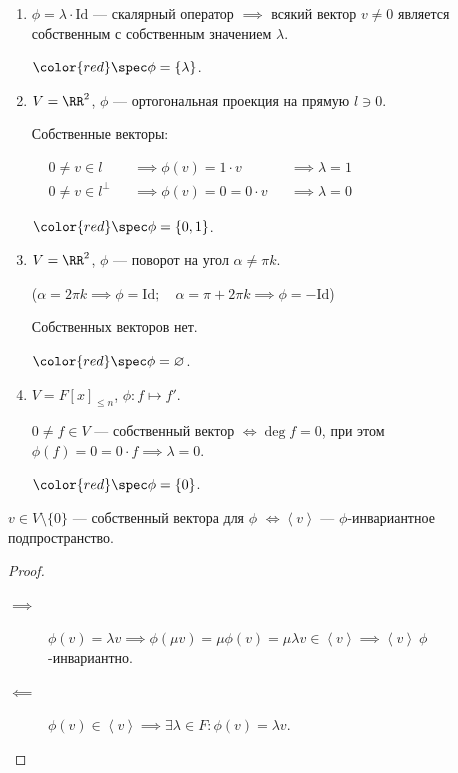 \begin{enumerate}
    \item $\phi = \lambda \cdot \mathrm{Id}$ --- скалярный оператор $ \implies $ всякий вектор $v \neq 0$ является собственным с собственным значением $\lambda$.

        $\color{red} \spec \phi = \{\lambda\}$.

    \item $V = \RR^2$, $\phi$ --- ортогональная проекция на прямую $l \ni 0$.

        Собственные векторы:

        \begin{math}
            \begin{aligned}
                &0 \neq v \in l &&\implies \phi(v) = 1 \cdot v &&\implies \lambda = 1 \\
                &0 \neq v \in l^{\perp} &&\implies \phi(v) = 0 = 0 \cdot v &&\implies \lambda = 0
            \end{aligned}
        \end{math}

        $\color{red} \spec \phi = \{0, 1\}$.

    \item $V = \RR^2$, $\phi$ --- поворот на угол $\alpha \neq \pi k$.

        ($\alpha = 2\pi k \implies \phi = \mathrm{Id}; \quad \alpha = \pi + 2 \pi k \implies \phi = -\mathrm{Id}$)

        Собственных векторов нет.

        $\color{red} \spec \phi = \varnothing$.

    \item $V = F[x]_{\leq n}$, $\phi \colon f \mapsto f'$.

        $0 \neq f \in V$ --- собственный вектор $\iff \deg f = 0$, при этом $\phi(f) = 0 = 0 \cdot f \implies \lambda = 0$.

        $\color{red} \spec \phi = \{0\}$.
\end{enumerate}

\medskip
\begin{proposal}
    $v \in V \setminus \{0\} $ --- собственный вектора для $\phi$ $\iff \left< v \right>$ --- $\phi$-инвариантное подпространство.
\end{proposal}

\begin{proof}~
    \begin{description}
    \item[$\implies$] $\phi(v) = \lambda v \implies \phi(\mu v) = \mu \phi(v) = \mu \lambda v \in \left< v \right> \implies \left< v \right> \ \phi$-инвариантно.
    \item[$\impliedby$] $\phi(v) \in \left< v \right> \implies \exists \lambda \in F : \phi(v) = \lambda v$.
        \qedhere
    \end{description}
\end{proof}


